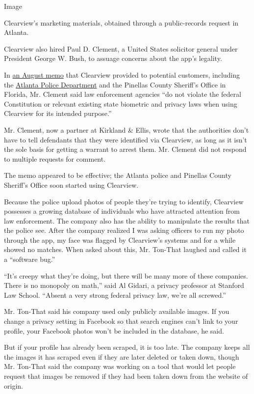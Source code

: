 Image

Clearview's marketing materials, obtained through a public-records
request in Atlanta.

Clearview also hired Paul D. Clement, a United States solicitor general
under President George W. Bush, to assuage concerns about the app's
legality.

In
\href{https://int.nyt.com/data/documenthelper/6689-clearview-legal-memo/c8b081a0bcca12e7903a/optimized/full.pdf\#page=1}{an
August memo} that Clearview provided to potential customers, including
the
\href{https://www.muckrock.com/foi/atlanta-325/facial-recognition-atlanta-ga-76491}{Atlanta
Police Department} and the Pinellas County Sheriff's Office in Florida,
Mr. Clement said law enforcement agencies ``do not violate the federal
Constitution or relevant existing state biometric and privacy laws when
using Clearview for its intended purpose.''

Mr. Clement, now a partner at Kirkland \& Ellis, wrote that the
authorities don't have to tell defendants that they were identified via
Clearview, as long as it isn't the sole basis for getting a warrant to
arrest them. Mr. Clement did not respond to multiple requests for
comment.

The memo appeared to be effective; the Atlanta police and Pinellas
County Sheriff's Office soon started using Clearview.

Because the police upload photos of people they're trying to identify,
Clearview possesses a growing database of individuals who have attracted
attention from law enforcement. The company also has the ability to
manipulate the results that the police see. After the company realized I
was asking officers to run my photo through the app, my face was flagged
by Clearview's systems and for a while showed no matches. When asked
about this, Mr. Ton-That laughed and called it a ``software bug.''

``It's creepy what they're doing, but there will be many more of these
companies. There is no monopoly on math,'' said Al Gidari, a privacy
professor at Stanford Law School. ``Absent a very strong federal privacy
law, we're all screwed.''

Mr. Ton-That said his company used only publicly available images. If
you change a privacy setting in Facebook so that search engines can't
link to your profile, your Facebook photos won't be included in the
database, he said.

But if your profile has already been scraped, it is too late. The
company keeps all the images it has scraped even if they are later
deleted or taken down, though Mr. Ton-That said the company was working
on a tool that would let people request that images be removed if they
had been taken down from the website of origin.

